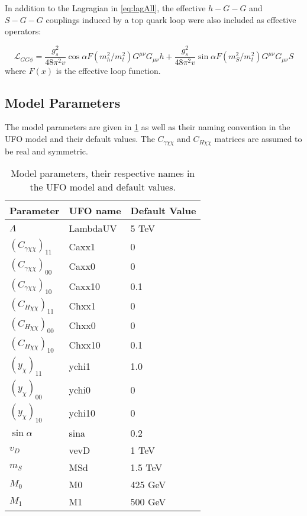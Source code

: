 \documentclass[a4paper,11pt]{article}
\begin{document}
In addition to the Lagragian in \cref{eq:lagAll}, the effective $h-G-G$ and $S-G-G$ couplings induced by a top quark loop were also included as effective operators:

\begin{equation*}
	\mathcal{L}_{GG\phi} =  \frac{g_s^2}{48 \pi^2 v} \cos\alpha F(m_h^2/m_t^2) G^{\mu\nu} G_{\mu\nu} h + \frac{g_s^2}{48 \pi^2 v} \sin\alpha F(m_S^2/m_t^2) G^{\mu\nu} G_{\mu\nu} S
\end{equation*}
where $F(x)$ is the effective loop function.
\subsection*{Model Parameters}

The model parameters are given in \cref{tab:parameters} as well as their naming convention in the UFO model and their default values. The $C_{\gamma \chi\chi}$ and $C_{H \chi\chi}$ matrices are assumed to be real and symmetric.


\begin{table}[h!]   \centering
	\vspace{0.2cm}
	\caption{Model parameters, their respective names in the UFO model and default values.\label{tab:parameters}}
	\begin{tabular}{p{2cm}|p{3cm}|p{3cm}}
		\toprule
		\textbf{Parameter} & \textbf{UFO name} & \textbf{Default Value}\\ \toprule 
		$\Lambda$  & LambdaUV & 5 TeV\\
		$(C_{\gamma \chi\chi})_{11}$  & Caxx1 & 0\\
		$(C_{\gamma \chi\chi})_{00}$  & Caxx0 & 0\\
		$(C_{\gamma \chi\chi})_{10}$  & Caxx10 & 0.1\\
		$(C_{H \chi\chi})_{11}$  & Chxx1 & 0\\
		$(C_{H \chi\chi})_{00}$  & Chxx0 & 0\\
		$(C_{H \chi\chi})_{10}$  & Chxx10 & 0.1\\
		$(y_\chi)_{11}$  & ychi1 & 1.0\\
		$(y_\chi)_{00}$  & ychi0 & 0\\
		$(y_\chi)_{10}$  & ychi10 & 0\\
		$\sin\alpha$  & sina & 0.2\\
		$v_D$  & vevD & 1 TeV\\
		$m_S$ & MSd & 1.5 TeV\\ 
		$M_0$ & M0 & 425 GeV\\
		$M_1$ & M1 & 500 GeV\\
		\bottomrule        
	\end{tabular}
\end{table}
\end{document}

